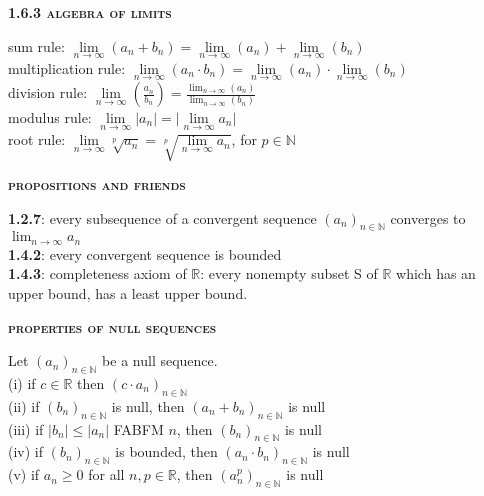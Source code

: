 \documentclass[a4paper]{article}
\begin{document}
\begin{multicols}{2}
\begin{framed}
	\begin{center}
		\textbf{\textsc{1.6.3 algebra of limits}}
	\end{center}
	sum rule: $\lim\limits_{n \rightarrow \infty}(a_n + b_n) = \lim\limits_{n \rightarrow \infty}(a_n) + \lim\limits_{n \rightarrow \infty}(b_n)$\\
	multiplication rule: $\lim\limits_{n \rightarrow \infty}(a_n \cdot b_n) = \lim\limits_{n \rightarrow \infty}(a_n) \cdot \lim\limits_{n \rightarrow \infty}(b_n)$\\
	division rule: $\lim\limits_{n \rightarrow \infty}(\frac{a_n}{b_n}) = \frac{\lim_{n \rightarrow \infty}(a_n)}{\lim_{n \rightarrow \infty}(b_n)}$\\
	modulus rule: $\lim\limits_{n \rightarrow \infty}\vert a_n \vert = \vert \lim\limits_{n \rightarrow \infty}a_n \vert $\\
	root rule: $\lim\limits_{n \rightarrow \infty}\sqrt[p]{a_n} = \sqrt[p]{\lim\limits_{n \rightarrow \infty}a_n}$, for $p \in \mathbb{N}$\\
\end{framed}

\begin{framed}
	\begin{center}
		\textbf{\textsc{propositions and friends}}
	\end{center}
	\textbf{1.2.7}: every subsequence of a convergent sequence $(a_n)_{n\in \mathbb{N}}$ converges to $\lim_{n \rightarrow \infty}a_n$\\
	\textbf{1.4.2}: every convergent sequence is bounded\\
	\textbf{1.4.3}: completeness axiom of $\mathbb{R}$: every nonempty subset S of $\mathbb{R}$ which has an upper bound, has a least upper bound.
\end{framed}

\begin{framed}
	\begin{center}
		\textbf{\textsc{properties of null sequences}}
	\end{center}
	Let $(a_n)_{n\in \mathbb{N}}$ be a null sequence.\\
	(i) if $c \in \mathbb{R}$ then $(c \cdot a_n)_{n\in \mathbb{N}}$\\
	(ii) if $(b_n)_{n\in \mathbb{N}}$ is null, then $(a_n + b_n)_{n\in \mathbb{N}}$ is null\\
	(iii) if $\vert b_n \vert \leq \vert a_n \vert$ FABFM $n$, then $(b_n)_{n\in \mathbb{N}}$ is null\\
	(iv) if $(b_n)_{n\in \mathbb{N}}$ is bounded, then $(a_n \cdot b_n)_{n\in \mathbb{N}}$ is null\\
	(v) if $a_n \geq 0$ for all $n, p \in \mathbb{R}$, then $(a^p_n)_{n\in \mathbb{N}}$ is null\\
	

\end{framed}
\end{multicols}
\end{document}
